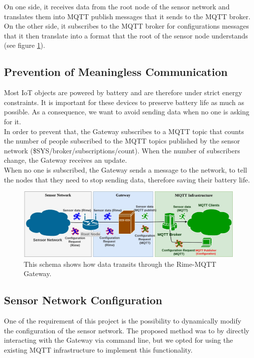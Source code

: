 \documentclass[a4paper,11pt]{article}
\begin{document}
On one side, it receives data from the root node of the sensor network and translates them into MQTT publish messages that it sends to the MQTT broker. On the other side, it subscribes to the MQTT broker for configurations messages that it then translate into a format that the root of the sensor node understands (see figure \ref{fig:communication1}).\\


\subsection{Prevention of Meaningless Communication}
Most IoT objects are powered by battery and are therefore under strict energy constraints. It is important for these devices to preserve battery life as much as possible. As a consequence, we want to avoid sending data when no one is asking for it.\\

In order to prevent that, the Gateway subscribes to a MQTT topic that counts the number of people subscribed to the MQTT topics published by the sensor network (\$SYS/broker/subscriptions/count). When the number of subscribers change, the Gateway receives an update.\\

When no one is subscribed, the Gateway sends a message to the network, to tell the nodes that they need to stop sending data, therefore saving their battery life.

\begin{figure}
  \includegraphics[width=\linewidth]{img/communication-2.jpg}
  \caption{This schema shows how data transits through the Rime-MQTT Gateway.}
  \label{fig:communication1}
\end{figure}

\subsection{Sensor Network Configuration}
One of the requirement of this project is the possibility to dynamically modify the configuration of the sensor network. The proposed method was to by directly interacting with the Gateway via command line, but we opted for using the existing MQTT infrastructure to implement this functionality.\\
\end{document}
